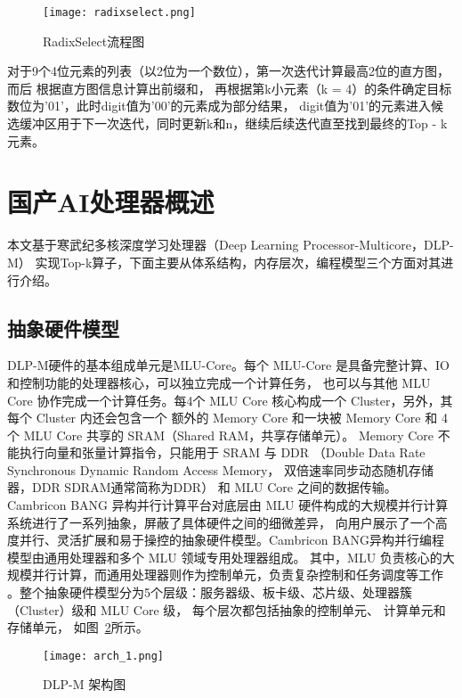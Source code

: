 \begin{figure}[ht]
    \centering
    \texttt{[image: radixselect.png]}
    \caption{RadixSelect流程图}
    \label{fig:radixselect}
\end{figure}

对于9个4位元素的列表（以2位为一个数位），第一次迭代计算最高2位的直方图，而后
根据直方图信息计算出前缀和，
再根据第k小元素（k = 4）的条件确定目标数位为'01'，此时digit值为'00'的元素成为部分结果，
digit值为'01'的元素进入候选缓冲区用于下一次迭代，同时更新k和n，继续后续迭代直至找到最终的Top - k元素。




\section{国产AI处理器概述}
本文基于寒武纪多核深度学习处理器（Deep Learning Processor-Multicore，DLP-M）
实现Top-k算子，下面主要从体系结构，内存层次，编程模型三个方面对其进行介绍。
\subsection{抽象硬件模型}
DLP-M硬件的基本组成单元是MLU-Core。每个 MLU-Core 是具备完整计算、IO和控制功能的处理器核心，可以独立完成一个计算任务，
也可以与其他 MLU Core 协作完成一个计算任务。每4个 MLU Core 核心构成一个 Cluster，另外，其每个 Cluster 内还会包含一个
额外的 Memory Core 和一块被 Memory Core 和 4 个 MLU Core 共享的 SRAM（Shared RAM，共享存储单元）。
Memory Core 不能执行向量和张量计算指令，只能用于 SRAM 与 DDR （Double Data Rate Synchronous Dynamic Random Access Memory，
双倍速率同步动态随机存储器，DDR SDRAM通常简称为DDR） 和 MLU Core 之间的数据传输。
Cambricon BANG 异构并行计算平台对底层由 MLU 硬件构成的大规模并行计算系统进行了一系列抽象，屏蔽了具体硬件之间的细微差异，
向用户展示了一个高度并行、灵活扩展和易于操控的抽象硬件模型。Cambricon BANG异构并行编程模型由通用处理器和多个 MLU 领域专用处理器组成。
其中，MLU 负责核心的大规模并行计算，而通用处理器则作为控制单元，负责复杂控制和任务调度等工作
。整个抽象硬件模型分为5个层级：服务器级、板卡级、芯片级、处理器簇（Cluster）级和 MLU Core 级，
每个层次都包括抽象的控制单元、
计算单元和存储单元，
如图~\ref{fig:arch}所示。
\begin{figure}[ht]
    \centering
    \texttt{[image: arch\_1.png]}
    \caption{DLP-M 架构图}
    \label{fig:arch}
    \note{}
  \end{figure}

